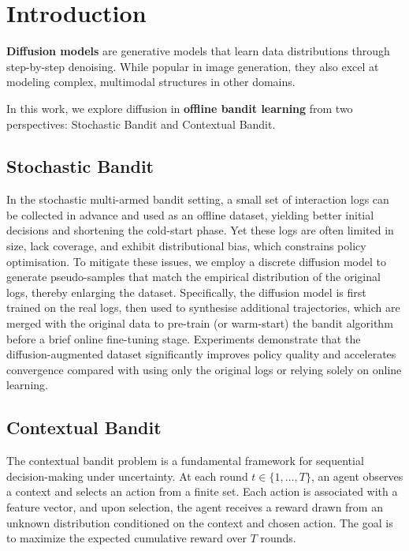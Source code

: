 \section{Introduction} \label{sec:1_introduction}

\textbf{Diffusion models}\cite{campbell2022continuous} are generative models that learn data distributions through step-by-step denoising. While popular in image generation, they also excel at modeling complex, multimodal structures in other domains.



In this work, we explore diffusion in \textbf{offline bandit learning} from two perspectives: Stochastic Bandit and Contextual Bandit.

\subsection{Stochastic Bandit}
In the stochastic multi-armed bandit setting, a small set of interaction logs can be collected in advance and used as an offline dataset, yielding better initial decisions and shortening the cold-start phase. Yet these logs are often limited in size, lack coverage, and exhibit distributional bias, which constrains policy optimisation. To mitigate these issues, we employ a discrete diffusion model to generate pseudo-samples that match the empirical distribution of the original logs, thereby enlarging the dataset. Specifically, the diffusion model is first trained on the real logs, then used to synthesise additional trajectories, which are merged with the original data to pre-train (or warm-start) the bandit algorithm before a brief online fine-tuning stage. Experiments demonstrate that the diffusion-augmented dataset significantly improves policy quality and accelerates convergence compared with using only the original logs or relying solely on online learning.



\subsection{Contextual Bandit}
The contextual bandit problem is a fundamental framework for sequential decision-making under uncertainty. At each round $t \in \{1, \dots, T\}$, an agent observes a context and selects an action from a finite set. Each action is associated with a feature vector, and upon selection, the agent receives a reward drawn from an unknown distribution conditioned on the context and chosen action. The goal is to maximize the expected cumulative reward over $T$ rounds. 


